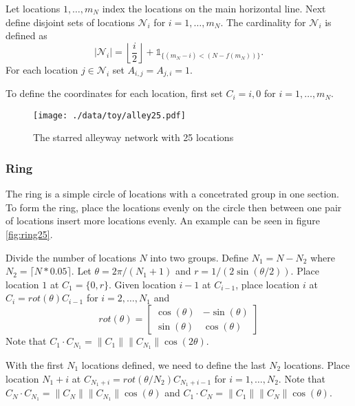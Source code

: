 \documentclass[11pt]{article}
\begin{document}
Let locations $1,\ldots,m_N$ index the locations on the main
horizontal line.  Next define disjoint sets of locations
$\mathcal{N}_i$ for $i = 1,\ldots,m_N$.  The cardinality for
$\mathcal{N}_i$ is defined as
\begin{equation*}
  | \mathcal{N}_i | = \left\lfloor \frac{i}{2} \right\rfloor +
  \mathds{1}_{\lbrace(m_N - i) < (N - f(m_N))\rbrace}.
\end{equation*}
For each location $j \in \mathcal{N}_i$ set $A_{i,j} = A_{j,i} = 1$.

To define the coordinates for each location, first set $C_{i} = {i,0}$
for $i = 1,\ldots,m_N$.


\begin{figure}[htb]
\centering
\texttt{[image: ./data/toy/alley25.pdf]}
\caption{\label{fig:alley25}The starred alleyway network with 25 locations}
\end{figure}



\subsubsection{Ring}
\label{sec-1-3-3}

The ring is a simple circle of locations with a concetrated group in one
section.  To form the ring, place the locations evenly on the circle
then between one pair of locations insert more locations evenly.  An
example can be seen in figure \ref{fig:ring25}.

Divide the number of locations $N$ into two groups.  Define $N_1 = N -
N_2$ where $N_2 = \lceil N*0.05 \rceil$.  Let $\theta = 2\pi/(N_1+1)$
and $r = 1/(2\sin(\theta/2))$.  Place location $1$ at $C_1 = \lbrace
0,r \rbrace$.  Given location $i-1$ at $C_{i-1}$, place location $i$
at $C_i = rot(\theta) C_{i-1}$ for $i = 2,\ldots,N_1$ and
\begin{equation*}
  rot(\theta) = \left[
    \begin{matrix}
      \cos(\theta) & -\sin(\theta)\\
      \sin(\theta) & \cos(\theta)
    \end{matrix}
  \right]
\end{equation*}
Note that $C_{1} \cdot C_{N_1} = \|C_{1}\| \|C_{N_1}\| \cos(2\theta)$.

With the first $N_1$ locations defined, we need to define the last
$N_2$ locations.  Place location $N_1 + i$ at $C_{N_1 + i} =
rot(\theta/N_2)C_{N_1 + i - 1}$ for $i = 1,\ldots,N_2$.  Note that
$C_{N} \cdot C_{N_1} = \|C_{N}\| \|C_{N_1}\| \cos(\theta)$ and $C_{1}
\cdot C_{N} = \|C_{1}\| \|C_{N}\| \cos(\theta)$.
\end{document}
